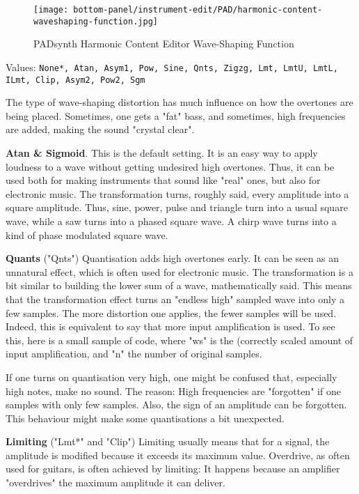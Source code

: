 \begin{figure}[H]
   \centering
   \texttt{[image: bottom-panel/instrument-edit/PAD/harmonic-content-waveshaping-function.jpg]}
   \caption{PADsynth Harmonic Content Editor Wave-Shaping Function}
   \label{fig:padsynth_harmonic_content_editor_waveshaping_function}
\end{figure}

   Values: \texttt{None*, Atan, Asym1, Pow, Sine, Qnts, Zigzg, Lmt,
              LmtU, LmtL, ILmt, Clip, Asym2, Pow2, Sgm}

   The type of wave-shaping distortion has much influence on how the
   overtones are being placed. Sometimes, one gets a "fat" bass, and
   sometimes, high frequencies are added, making the sound "crystal clear".

   \textbf{Atan \& Sigmoid}.
   This is the default setting. It is an easy way to apply loudness to a wave
   without getting undesired high overtones. Thus, it can be used both for
   making instruments that sound like "real" ones, but also for electronic
   music. The transformation turns, roughly said, every amplitude into a
   square amplitude. Thus, sine, power, pulse and triangle turn into a usual
   square wave, while a saw turns into a phased square wave. A chirp wave
   turns into a kind of phase modulated square wave.

   \textbf{Quants} ("Qnts")
   Quantisation adds high overtones early. It can be seen as an unnatural
   effect, which is often used for electronic music.  The transformation is a
   bit similar to building the lower sum of a wave, mathematically said. This
   means that the transformation effect turns an "endless high" sampled
   wave into only a few samples. The more distortion one applies, the fewer
   samples will be used. Indeed, this is equivalent to say that more input
   amplification is used. To see this, here is a small sample of code, where
   "ws" is the (correctly scaled amount of input amplification, and "n" the
   number of original samples.

   If one turns on quantisation very high, one might be confused that,
   especially high notes, make no sound. The reason: High frequencies are
   "forgotten" if one samples with only few samples. Also, the sign of an
   amplitude can be forgotten. This behaviour might make some quantisations a
   bit unexpected.

   \textbf{Limiting} ("Lmt*" and "Clip")
   Limiting usually means that for a signal, the amplitude is modified
   because it exceeds its maximum value. Overdrive, as often used for
   guitars, is often achieved by limiting: It happens because an amplifier
   "overdrives" the maximum amplitude it can deliver.

